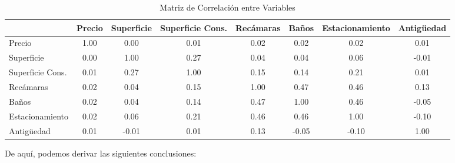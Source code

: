 \begin{table}[h!]
\centering
\caption{Matriz de Correlación entre Variables}
\label{table:correlacion_variables}
\tiny %
\begin{tabular}{
  l
  S[table-format=1.2]
  S[table-format=1.2]
  S[table-format=1.2]
  S[table-format=1.2]
  S[table-format=1.2]
  S[table-format=1.2]
  S[table-format=1.2]
}
\toprule
  {} & {Precio} & {Superficie} & {Superficie Cons.} & {Recámaras} & {Baños} & {Estacionamiento} & {Antigüedad} \\
\midrule
Precio              & 1.00 & 0.00 & 0.01 & 0.02 & 0.02 & 0.02 & 0.01 \\
Superficie          & 0.00 & 1.00 & 0.27 & 0.04 & 0.04 & 0.06 & -0.01 \\
Superficie Cons.    & 0.01 & 0.27 & 1.00 & 0.15 & 0.14 & 0.21 & 0.01 \\
Recámaras           & 0.02 & 0.04 & 0.15 & 1.00 & 0.47 & 0.46 & 0.13 \\
Baños               & 0.02 & 0.04 & 0.14 & 0.47 & 1.00 & 0.46 & -0.05 \\
Estacionamiento     & 0.02 & 0.06 & 0.21 & 0.46 & 0.46 & 1.00 & -0.10 \\
Antigüedad          & 0.01 & -0.01 & 0.01 & 0.13 & -0.05 & -0.10 & 1.00 \\
\bottomrule
\end{tabular}
\normalsize %
\end{table}

De aquí, podemos derivar las siguientes conclusiones:

